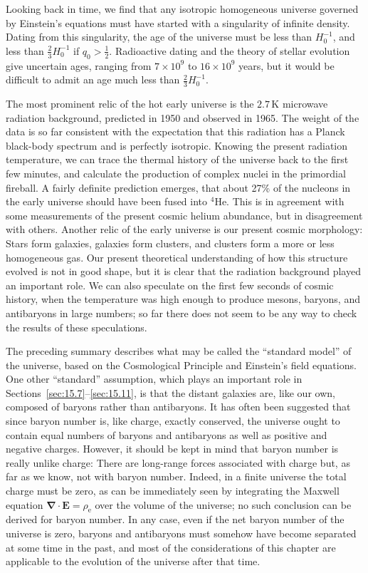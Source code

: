 Looking back in time, we find that any isotropic homogeneous universe governed
by Einstein's equations must have started with a singularity of infinite
density. Dating from this singularity, the age of the universe must be less than
\(H_0^{-1}\), and less than \(\tfrac23H_0^{-1}\) if \(q_0>\tfrac12\).
Radioactive dating and the theory of stellar evolution give uncertain ages,
ranging from \(7\times10^9\) to \(16\times10^9\) years, but it would be
difficult to admit an age much less than \(\tfrac23H_0^{-1}\).

The most prominent relic of the hot early universe is the \(2.7\,\mathrm{K}\)
microwave radiation background, predicted in 1950 and observed in 1965. The
weight of the data is so far consistent with the expectation that this radiation
has a Planck black-body spectrum and is perfectly isotropic. Knowing the present
radiation temperature, we can trace the thermal history of the universe back to
the first few minutes, and calculate the production of complex nuclei in the
primordial fireball. A fairly definite prediction emerges, that about 27\% of the
nucleons in the early universe should have been fused into
\({}^{4}\mathrm{He}\). This is in agreement with some measurements of the
present cosmic helium abundance, but in disagreement with others. Another relic
of the early universe is our present cosmic morphology: Stars form galaxies,
galaxies form clusters, and clusters form a more or less homogeneous gas. Our
present theoretical understanding of how this structure evolved is not in good
shape, but it is clear that the radiation background played an important role.
We can also speculate on the first few seconds of cosmic history, when the
temperature was high enough to produce mesons, baryons, and antibaryons in
large numbers; so far there does not seem to be any way to check the results of
these speculations.

The preceding summary describes what may be called the ``standard model'' of
the universe, based on the Cosmological Principle and Einstein's field equations.
One other ``standard'' assumption, which plays an important role in
Sections~\ref{sec:15.7}--\ref{sec:15.11}, is that the distant galaxies are, like
our own, composed of baryons rather than antibaryons. It has often been
suggested that since baryon number is, like charge, exactly conserved, the
universe ought to contain equal numbers of baryons and antibaryons as well as
positive and negative charges. However, it should be kept in mind that baryon
number is really unlike charge: There are long-range forces associated with
charge but, as far as we know, not with baryon number. Indeed, in a finite
universe the total charge must be zero, as can be immediately seen by integrating
the Maxwell equation \(\boldsymbol{\nabla}\cdot\mathbf{E}=\rho_{\mathrm{e}}\) over
the volume of the universe; no such conclusion can be derived for baryon
number. In any case, even if the net baryon number of the universe is zero,
baryons and antibaryons must somehow have become separated at some time in the
past, and most of the considerations of this chapter are applicable to the
evolution of the universe after that time.

